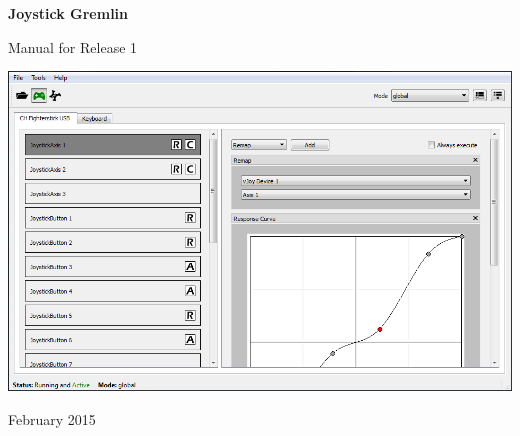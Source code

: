 \begin{titlepage}
\begin{center}
	\vspace*{\fill}
	\vspace*{-3cm}
    \begin{Huge}
        \textbf{Joystick Gremlin}
    \end{Huge}

    \vspace{1cm}

    \begin{Large}
        {Manual for Release 1}
    \end{Large}

    \vspace{3cm}

    \includegraphics[width=0.9\linewidth]{images/main_screen}

    \vspace{6.0cm}

	February 2015
\vspace*{\fill}
\end{center}
\end{titlepage}
